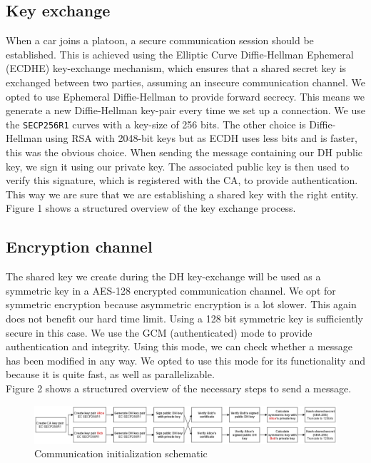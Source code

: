 \documentclass[a4paper, 11pt]{article}
\begin{document}
\subsection{Key exchange}
When a car joins a platoon, a secure communication session should be
established. This is achieved using the Elliptic Curve Diffie-Hellman Ephemeral
(ECDHE) key-exchange mechanism, which ensures that a shared secret key is
exchanged between two parties, assuming an insecure communication channel. We
opted to use Ephemeral Diffie-Hellman to provide forward secrecy. This means we
generate a new Diffie-Hellman key-pair every time we set up a connection. We use
the \texttt{SECP256R1} curves with a key-size of 256 bits. The other choice is
Diffie-Hellman using RSA with 2048-bit keys but as ECDH uses less bits and is
faster, this was the obvious choice. When sending the message containing our DH
public key, we sign it using our private key.
The associated public key is then used to verify this signature,
which is registered with the CA, to provide authentication.
This way we are sure that we are establishing a shared key
with the right entity.\\

Figure 1 shows a structured overview of the key exchange process.

\newpage
\subsection{Encryption channel}
The shared key we create during the DH key-exchange will be used as a symmetric
key in a AES-128 encrypted communication channel.
We opt for symmetric encryption because asymmetric encryption is a lot slower. This again does not benefit
our hard time limit.
Using a 128 bit symmetric key is sufficiently secure in this case. We use the
GCM (authenticated) mode to provide authentication and integrity. Using this
mode, we can check whether a message has been modified in any way. We opted to
use this mode for its functionality and because it is quite fast, as well as
parallelizable.\\

Figure 2 shows a structured overview of the necessary steps to send a message.

\begin{figure}
\includegraphics[scale=0.5]{imgs/IS_Demo_DH}
\caption{Communication initialization schematic}
\end{figure}
\end{document}
